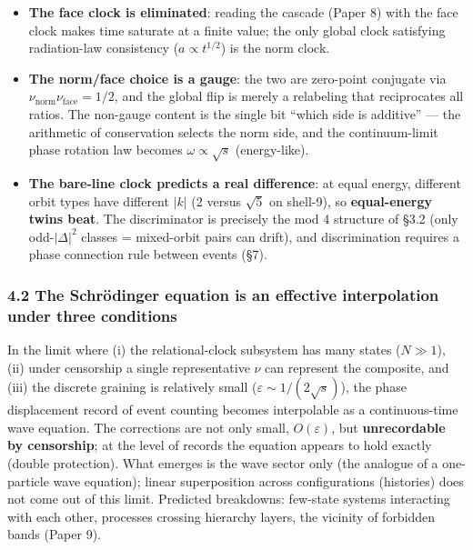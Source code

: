 \documentclass[
]{ltjsarticle}
\providecommand{\tightlist}{%
  \setlength{\itemsep}{0pt}\setlength{\parskip}{0pt}}
\begin{document}
\begin{itemize}
\tightlist
\item
  \textbf{The face clock is eliminated}: reading the cascade (Paper 8)
  with the face clock makes time saturate at a finite value; the only
  global clock satisfying radiation-law consistency
  (\(a\propto t^{1/2}\)) is the norm clock.
\item
  \textbf{The norm/face choice is a gauge}: the two are zero-point
  conjugate via \(\nu_{\mathrm{norm}}\nu_{\mathrm{face}}=1/2\), and the
  global flip is merely a relabeling that reciprocates all ratios. The
  non-gauge content is the single bit ``which side is additive'' --- the
  arithmetic of conservation selects the norm side, and the
  continuum-limit phase rotation law becomes \(\omega\propto\sqrt s\)
  (energy-like).
\item
  \textbf{The bare-line clock predicts a real difference}: at equal
  energy, different orbit types have different \(|k|\) (2 versus
  \(\sqrt5\) on shell-9), so \textbf{equal-energy twins beat}. The
  discriminator is precisely the mod 4 structure of §3.2 (only
  odd-\(|\Delta|^2\) classes = mixed-orbit pairs can drift), and
  discrimination requires a phase connection rule between events (§7).
\end{itemize}

\subsubsection{4.2 The Schrödinger equation is an effective
interpolation under three
conditions}\label{the-schruxf6dinger-equation-is-an-effective-interpolation-under-three-conditions}

In the limit where (i) the relational-clock subsystem has many states
(\(N\gg1\)), (ii) under censorship a single representative \(\nu\) can
represent the composite, and (iii) the discrete graining is relatively
small (\(\varepsilon\sim1/(2\sqrt s)\)), the phase displacement record
of event counting becomes interpolable as a continuous-time wave
equation. The corrections are not only small, \(O(\varepsilon)\), but
\textbf{unrecordable by censorship}; at the level of records the
equation appears to hold exactly (double protection). What emerges is
the wave sector only (the analogue of a one-particle wave equation);
linear superposition across configurations (histories) does not come out
of this limit. Predicted breakdowns: few-state systems interacting with
each other, processes crossing hierarchy layers, the vicinity of
forbidden bands (Paper 9).
\end{document}
